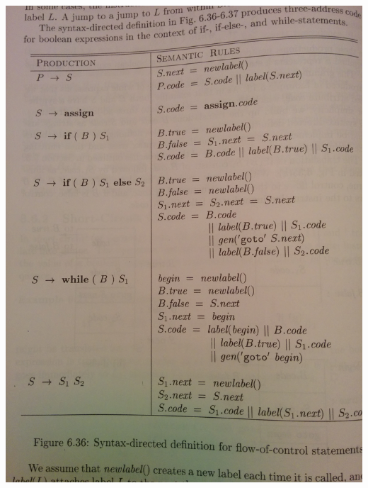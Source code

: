 \documentclass[11pt, oneside]{article}   	%
\begin{document}
\newpage

\includegraphics[scale=0.12]{IMG_20141029_013718.jpg}
\end{document}
